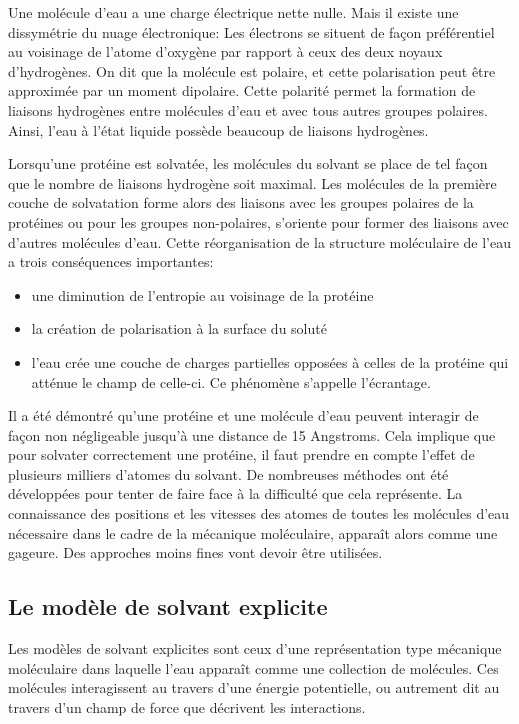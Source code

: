 Une molécule d'eau a une charge électrique nette nulle. Mais il existe une dissymétrie du nuage électronique: Les électrons se situent de façon préférentiel au voisinage de l'atome d'oxygène par rapport à ceux des deux noyaux d'hydrogènes.
On dit que la molécule est polaire, et cette polarisation peut être approximée par un moment dipolaire. Cette polarité permet la formation de liaisons hydrogènes entre molécules d'eau et avec tous autres groupes polaires. Ainsi, l'eau à l'état liquide possède beaucoup de liaisons hydrogènes.

Lorsqu'une protéine est solvatée, les molécules du solvant se place de tel façon que le nombre de liaisons hydrogène soit maximal. Les molécules de la première couche de solvatation forme alors des liaisons avec les groupes polaires de la protéines ou pour les groupes non-polaires, s'oriente pour former des liaisons avec d'autres molécules d'eau. Cette réorganisation de la structure moléculaire de l'eau a trois conséquences importantes:

\begin{itemize}
\item une diminution de l'entropie au voisinage de la protéine  
\item la création de polarisation à la surface du soluté
\item  l'eau crée une couche de charges partielles opposées à celles de la protéine qui atténue le champ de celle-ci. Ce phénomène s'appelle l'écrantage.
\end{itemize}
  
Il a été démontré qu'une protéine et une molécule d'eau peuvent interagir de façon non négligeable jusqu'à une distance de 15 Angstroms. Cela implique que pour solvater correctement une protéine, il faut prendre en compte l'effet de plusieurs milliers d'atomes du solvant.
De nombreuses méthodes ont été développées pour tenter de faire face à la difficulté que cela représente.
La connaissance des positions et les vitesses des atomes de toutes les molécules d'eau nécessaire dans le cadre de la mécanique moléculaire, apparaît alors comme une gageure. Des approches moins fines vont devoir être utilisées. 

\subsection{Le modèle de solvant explicite}

Les modèles de solvant explicites sont ceux d'une représentation type mécanique moléculaire dans laquelle l'eau apparaît comme une collection de molécules. Ces molécules interagissent au travers d'une énergie potentielle, ou autrement dit au travers d'un champ de force que décrivent les interactions.


